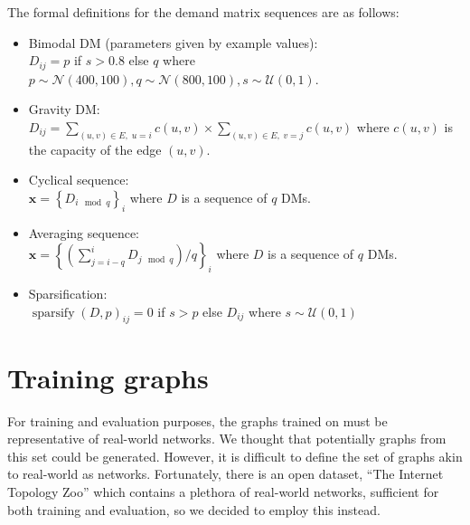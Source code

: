 The formal definitions for the demand matrix sequences are as follows:
\begin{itemize}
  \item Bimodal DM (parameters given by example values):\\
    $D_{ij} = p$ if $s > 0.8$ else $q$ where $p \sim \mathcal{N}(400, 100), q \sim \mathcal{N}(800, 100), s \sim \mathcal{U}(0,1)$.
  \item Gravity DM:\\
    $D_{ij} = \sum_{(u, v) \in E,\; u = i }{c(u,v)} \times \sum_{(u, v) \in E,\; v = j }{c(u, v)}$ where $c(u,v)$ is the capacity of the edge $(u,v)$.
  \item Cyclical sequence:\\
    $\bm{x} = \left\{ D_{i \mod q} \right\}_{i}$ where $D$ is a sequence of $q$ DMs.
  \item Averaging sequence:\\
    $\bm{x} = \left\{\left(\sum_{j=i-q}^{i}{D_{j \mod q}}\right) / q \right\}_{i}$ where $D$ is a sequence of $q$ DMs.
  \item Sparsification:\\
    $\operatorname{sparsify}(D, p)_{ij} = 0$ if $s > p$ else $D_{ij}$ where $s \sim \mathcal{U}(0,1)$
\end{itemize}

\section{Training graphs}
For training and evaluation purposes, the graphs trained on must be representative of real-world networks. We thought that potentially graphs from this set could be generated. However, it is difficult to define the set of graphs akin to real-world \ac{as} networks. Fortunately, there is an open dataset, \enquote{The Internet Topology Zoo}\cite{6027859} which contains a plethora of real-world networks, sufficient for both training and evaluation, so we decided to employ this instead.

